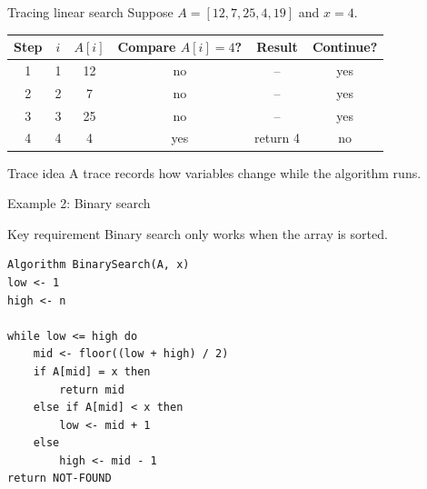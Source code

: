 \documentclass[11pt,aspectratio=43]{beamer}
\begin{document}
\begin{frame}{Tracing linear search}
Suppose $A = [12, 7, 25, 4, 19]$ and $x = 4$.

\vspace{0.6em}
\begin{center}
\begin{tabular}{cccccc}
  \toprule
  Step & $i$ & $A[i]$ & Compare $A[i]=4$? & Result & Continue? \\
  \midrule
  1 & 1 & 12 & no  & --       & yes \\
  2 & 2 & 7  & no  & --       & yes \\
  3 & 3 & 25 & no  & --       & yes \\
  4 & 4 & 4  & yes & return 4 & no  \\
  \bottomrule
\end{tabular}
\end{center}

\vspace{0.8em}
\begin{block}{Trace idea}
  A trace records how variables change while the algorithm runs.
\end{block}
\end{frame}

\begin{frame}[fragile]{Example 2: Binary search}
\begin{block}{Key requirement}
Binary search only works when the array is sorted.
\end{block}

\begin{lstlisting}[style=pseudo,basicstyle=\ttfamily\scriptsize]
Algorithm BinarySearch(A, x)
low <- 1
high <- n

while low <= high do
    mid <- floor((low + high) / 2)
    if A[mid] = x then
        return mid
    else if A[mid] < x then
        low <- mid + 1
    else
        high <- mid - 1
return NOT-FOUND
\end{lstlisting}
\end{frame}
\end{document}
